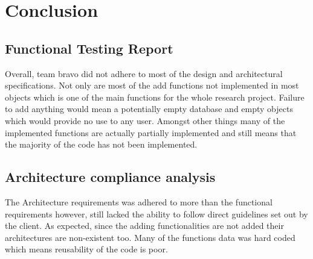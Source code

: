 \documentclass{article}
\begin{document}
\section{Conclusion}
\subsection{Functional Testing Report}
Overall, team bravo did not adhere to most of the design and architectural specifications. Not only are most of the add functions not implemented in most objects which is one of the main functions for the whole research project. Failure to add anything would mean a potentially empty database and empty objects which would provide no use to any user. Amongst other things many of the implemented functions are actually partially implemented and still means that the majority of the code has not been implemented.
\subsection{Architecture compliance analysis}
The Architecture requirements was adhered to more than the functional requirements however, still lacked the ability to follow direct guidelines set out by the client. As expected, since the adding functionalities are not added their architectures are non-existent too. Many of the functions data was hard coded which means reusability of the code is poor. 
\end{document}
